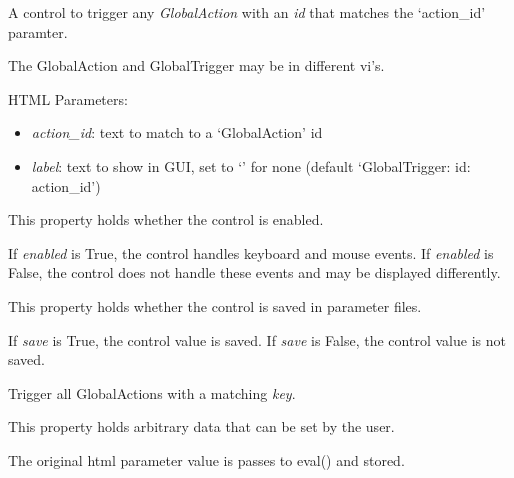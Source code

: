 \documentclass[letterpaper,10pt,english]{sphinxmanual}
\begin{document}

\begin{fulllineitems}
\label{api:controls.GlobalTrigger}
A control to trigger any \emph{GlobalAction} with an \emph{id} that matches the
`action\_id' paramter.

The GlobalAction and GlobalTrigger may be in different vi's.

HTML Parameters:
\begin{itemize}
\item {} 
\emph{action\_id}: text to match to a `GlobalAction' id

\item {} 
\emph{label}: text to show in GUI, set to `' for none (default `GlobalTrigger:  id: action\_id')

\end{itemize}

\begin{fulllineitems}
\label{api:controls.GlobalTrigger.enabled}
This property holds whether the control is enabled.

If \emph{enabled} is True, the control handles keyboard and mouse events.
If \emph{enabled} is False, the control does not handle these events and may
be displayed differently.

\end{fulllineitems}


\begin{fulllineitems}
\label{api:controls.GlobalTrigger.save}
This property holds whether the control is saved in parameter files.

If \emph{save} is True, the control value is saved.
If \emph{save} is False, the control value is not saved.

\end{fulllineitems}


\begin{fulllineitems}
\label{api:controls.GlobalTrigger.trigger}
Trigger all GlobalActions with a matching \emph{key}.

\end{fulllineitems}


\begin{fulllineitems}
\label{api:controls.GlobalTrigger.user}
This property holds arbitrary data that can be set by the user.

The original html parameter value is passes to eval() and stored.

\end{fulllineitems}


\end{fulllineitems}
\end{document}
